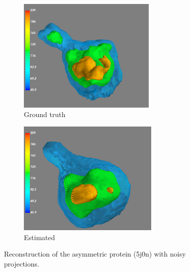 \begin{figure}
    \centering
    \begin{subfigure}[b]{0.45\textwidth}
        \includegraphics[height=5.5cm]{images/5j0n_reconstruction_GT_noise16.png}
        \caption{Ground truth}
    \end{subfigure}
    \hfill
    \begin{subfigure}[b]{0.5\textwidth}
    \centering
        \includegraphics[height=5.5cm]{images/5j0n_reconstruction_noise16.png}
        \caption{Estimated}
    \end{subfigure}
    
    \caption{ Reconstruction of the asymmetric protein (5j0n) with noisy projections.}
    \label{fig:reconstruction-noise0}
\end{figure}



